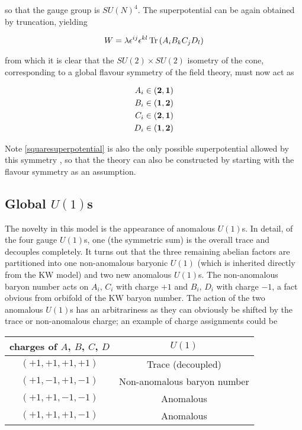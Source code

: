 so that the gauge group is $SU(N)^4$. The superpotential can be again obtained by truncation, yielding

\begin{equation}
	W = \lambda \epsilon^{ij} \epsilon^{kl} \operatorname{Tr}\left( A_i B_k C_j D_l \right)
	\label{squaresuperpotential}
\end{equation}

from which it is clear that the $SU(2) \times SU(2)$ isometry of the cone, corresponding to a global flavour symmetry of the field theory, must now act as

\begin{align}
	\begin{split}
		A_i \in (\mathbf{2}, \mathbf{1})\\
		B_i \in (\mathbf{1}, \mathbf{2})\\
		C_i \in (\mathbf{2}, \mathbf{1})\\
		D_i \in (\mathbf{1}, \mathbf{2})
	\end{split}
	\label{flavoursquare}
\end{align}

Note \eqref{squaresuperpotential} is also the only possible superpotential allowed by this symmetry \cite{Benvenutifourcycles}, so that the theory can also be constructed by starting with the flavour symmetry as an assumption.

\subsection{Global $U(1)$s} \label{sec:squaresuones}

The novelty in this model is the appearance of anomalous $U(1)$s. In detail, of the four gauge $U(1)$s, one (the symmetric sum) is the overall trace and decouples completely. It turns out that the three remaining abelian factors are partitioned into one non-anomalous baryonic $U(1)$ (which is inherited directly from the KW model) and two new anomalous $U(1)$s. The non-anomalous baryon number acts on $A_i$, $C_i$ with charge $+1$ and $B_i$, $D_i$ with charge $-1$, a fact obvious from orbifold of the KW baryon number. The action of the two anomalous $U(1)$s has an arbitrariness as they can obviously be shifted by the trace or non-anomalous charge; an example of charge assignments could be

\begin{center}
	\begin{tabular}[]{c|c}
		charges of $A$, $B$, $C$, $D$ & $U(1)$ \\ \hline \hline
		$(+1,+1,+1,+1)$ & Trace (decoupled) \\  \hline
		$(+1,-1,+1,-1)$ & Non-anomalous baryon number \\ 
		$(+1,+1,-1,-1)$ & Anomalous \\ 
		$(+1,+1,+1,-1)$ & Anomalous  
	\end{tabular}
\end{center}

